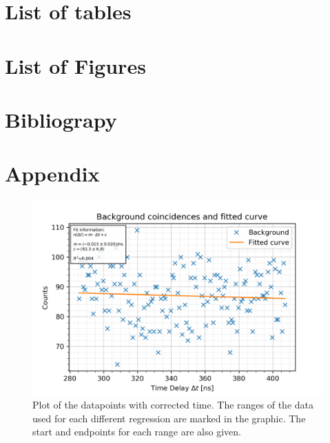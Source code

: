 \documentclass[30pt,a4paper]{article}
\begin{document}
 	\section{List of tables}
 	\listoftables
 	\section{List of Figures}
 	\listoffigures
 	\section{Bibliograpy}
 		
 		
 	\section{Appendix}
 	
 	\begin{figure}[h]
 		\includegraphics{Bilder/lin_bkgnd}
 		\centering
 		\caption[Background with Fit]{\small Plot of the datapoints with corrected time. The ranges of the data used for each different regression are marked in the graphic. The start and endpoints for each range are also given.}
 		\label{bckgnd_fit}
 	\end{figure}
  
\end{document}
